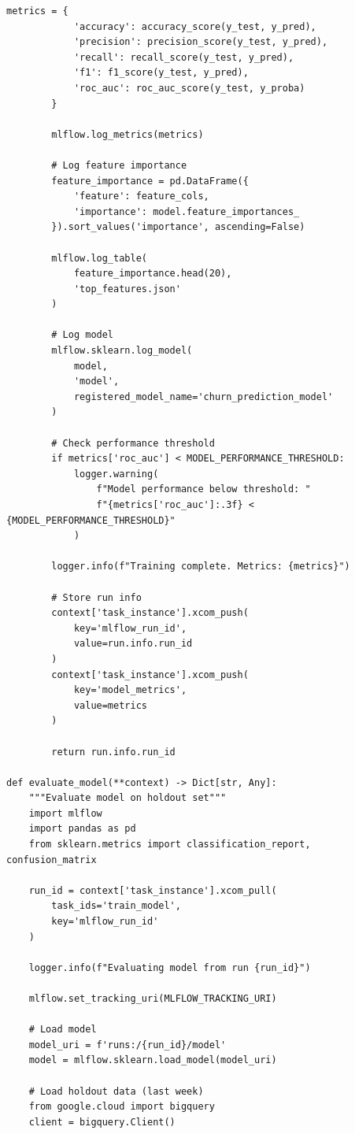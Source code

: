 \begin{lstlisting}[style=python, caption=Production ML Training Pipeline with Airflow]
        metrics = {
            'accuracy': accuracy_score(y_test, y_pred),
            'precision': precision_score(y_test, y_pred),
            'recall': recall_score(y_test, y_pred),
            'f1': f1_score(y_test, y_pred),
            'roc_auc': roc_auc_score(y_test, y_proba)
        }

        mlflow.log_metrics(metrics)

        # Log feature importance
        feature_importance = pd.DataFrame({
            'feature': feature_cols,
            'importance': model.feature_importances_
        }).sort_values('importance', ascending=False)

        mlflow.log_table(
            feature_importance.head(20),
            'top_features.json'
        )

        # Log model
        mlflow.sklearn.log_model(
            model,
            'model',
            registered_model_name='churn_prediction_model'
        )

        # Check performance threshold
        if metrics['roc_auc'] < MODEL_PERFORMANCE_THRESHOLD:
            logger.warning(
                f"Model performance below threshold: "
                f"{metrics['roc_auc']:.3f} < {MODEL_PERFORMANCE_THRESHOLD}"
            )

        logger.info(f"Training complete. Metrics: {metrics}")

        # Store run info
        context['task_instance'].xcom_push(
            key='mlflow_run_id',
            value=run.info.run_id
        )
        context['task_instance'].xcom_push(
            key='model_metrics',
            value=metrics
        )

        return run.info.run_id

def evaluate_model(**context) -> Dict[str, Any]:
    """Evaluate model on holdout set"""
    import mlflow
    import pandas as pd
    from sklearn.metrics import classification_report, confusion_matrix

    run_id = context['task_instance'].xcom_pull(
        task_ids='train_model',
        key='mlflow_run_id'
    )

    logger.info(f"Evaluating model from run {run_id}")

    mlflow.set_tracking_uri(MLFLOW_TRACKING_URI)

    # Load model
    model_uri = f'runs:/{run_id}/model'
    model = mlflow.sklearn.load_model(model_uri)

    # Load holdout data (last week)
    from google.cloud import bigquery
    client = bigquery.Client()


\end{lstlisting}
